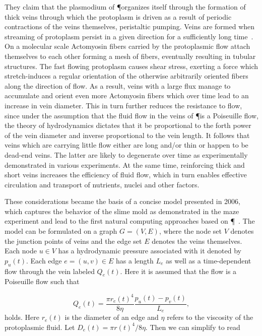 			They claim that the plasmodium of \P organizes itself through the formation of thick veins through which the protoplasm is driven as a result of periodic contractions of the veins themselves, \ie peristaltic pumping. Veins are formed when streaming of protoplasm persist in a given direction for a sufficiently long time~\cite{nakagaki2000interaction}. On a molecular scale Actomyosin fibers carried by the protoplasmic flow attach themselves to each other forming a mesh of fibers, eventually resulting in tubular structures. The fast flowing protoplasm causes shear stress, exerting a force which stretch-induces a regular orientation of the otherwise arbitrarily oriented fibers along the direction of flow. As a result, veins with a large flux manage to accumulate and orient even more Actomyosin fibers which over time lead to an increase in vein diameter. This in turn further reduces the resistance to flow, since under the assumption that the fluid flow in the veins of \P is a Poiseuille flow, the theory of hydrodynamics dictates that it be proportional to the forth power of the vein diameter and inverse proportional to the vein length. It follows that veins which are carrying little flow either are long and/or thin or happen to be dead-end veins. The latter are likely to degenerate over time as experimentally demonstrated in various experiments. At the same time, reinforcing thick and short veins increases the efficiency of fluid flow, which in turn enables effective circulation and transport of nutrients, nuclei and other factors.

			These considerations became the basis of a concise model presented in 2006, which captures the behavior of the slime mold as demonstrated in the maze experiment and lead to the first natural computing approaches based on \P~\cite{Tero2006115}. The model can be formulated on a graph $G = (V,E)$, where the node set $V$ denotes the junction points of veins and the edge set $E$ denotes the veins themselves. Each node $u \in V$ has a hydrodynamic pressure associated with it denoted by $p_u(t)$. Each edge $e = (u,v) \in E$ has a length $L_e$ as well as a time-dependent flow through the vein labeled $Q_e(t)$. Here it is assumed that the flow is a Poiseuille flow such that

			\begin{equation}
				Q_e(t) = \frac{\pi r_e(t)^4}{ 8 \eta} \frac{p_u(t)-p_v(t)}{L_e},
				\label{eq:flow_initial}
			\end{equation}
			holds. Here $r_e(t)$ is the diameter of an edge and $\eta$ refers to the viscosity of the protoplasmic fluid. Let $D_e(t) = \pi r(t)^4/ 8 \eta$. Then we can simplify  to read

